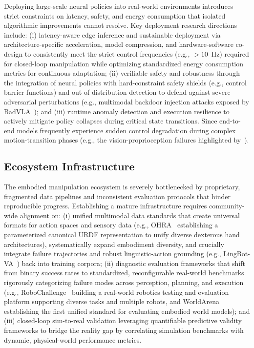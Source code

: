 \documentclass[acmsmall,screen,review,anonymous]{acmart}
\begin{document}
Deploying large-scale neural policies into real-world environments introduces strict constraints on latency, safety, and energy consumption that isolated algorithmic improvements cannot resolve. 
Key deployment research directions include: (i) latency-aware edge inference and sustainable deployment via architecture-specific acceleration, model compression, and hardware-software co-design to consistently meet the strict control frequencies (e.g., $>10$~Hz) required for closed-loop manipulation while optimizing standardized energy consumption metrics for continuous adaptation;
(ii) verifiable safety and robustness through the integration of neural policies with hard-constraint safety shields (e.g., control barrier functions) and out-of-distribution detection to defend against severe adversarial perturbations (e.g., multimodal backdoor injection attacks exposed by BadVLA~\cite{zhou2025badvla}); 
and (iii) runtime anomaly detection and execution resilience to actively mitigate policy collapses during critical state transitions. Since end-to-end models frequently experience sudden control degradation during complex motion-transition phases (e.g., the vision-proprioception failures highlighted by~\cite{lu2026whenwould}).

\subsection{Ecosystem Infrastructure}\label{sec:ecosystem_infrastructure}

The embodied manipulation ecosystem is severely bottlenecked by proprietary, fragmented data pipelines and inconsistent evaluation protocols that hinder reproducible progress. 
Establishing a mature infrastructure requires community-wide alignment on: (i) unified multimodal data standards that create universal formats for action spaces and sensory data (e.g., OHRA~\cite{wei2026one} establishing a parameterized canonical URDF representation to unify diverse dexterous hand architectures), 
systematically expand embodiment diversity, and crucially integrate failure trajectories and robust linguistic-action grounding (e.g., LingBot-VA~\cite{li2026lingrobotva}) back into training corpora; 
(ii) diagnostic evaluation frameworks that shift from binary success rates to standardized, reconfigurable real-world benchmarks rigorously categorizing failure modes across perception, planning, and execution (e.g., RoboChallenge~\cite{yakefu2025robochallenge} building a real-world robotics testing and evaluation platform supporting diverse tasks and multiple robots, and WorldArena~\cite{shang2026worldarena} establishing the first unified standard for evaluating embodied world models); 
and (iii) closed-loop sim-to-real validation leveraging quantifiable predictive validity frameworks to bridge the reality gap by correlating simulation benchmarks with dynamic, physical-world performance metrics.
\end{document}
